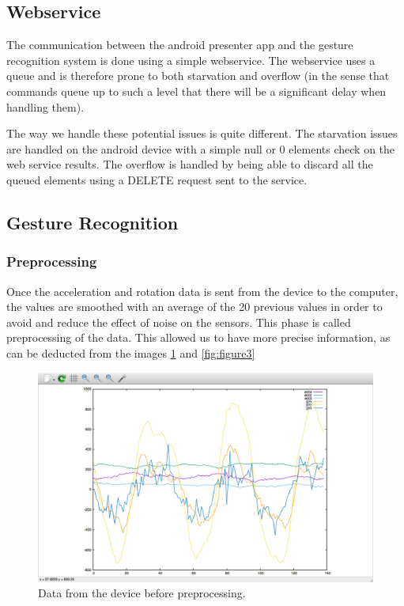 \subsection{Webservice}
The communication between the android presenter app and the gesture recognition system is done using a simple webservice.
The webservice uses a queue and is therefore prone to both starvation and overflow
(in the sense that commands queue up to such a level that there will be a significant delay when handling them).

The way we handle these potential issues is quite different.
The starvation issues are handled on the android device with a simple null or 0 elements check on the web service results.
The overflow is handled by being able to discard all the queued elements using a DELETE request sent to the service.

\subsection{Gesture Recognition}
\subsubsection{Preprocessing}
Once the acceleration and rotation data is sent from the device to the computer,
 the values are smoothed with an average of the 20 previous values in order to avoid and reduce the effect of noise on the sensors.
 This phase is called preprocessing of the data. 
 This allowed us to have more precise information, as can be deducted from the images  \ref{fig:figure2} and \ref{fig:figure3}

\begin{figure}[h]
\centering
\includegraphics[width=1\columnwidth]{img/raw}
\caption{Data from the device before preprocessing.}
\label{fig:figure2}
\end{figure}

